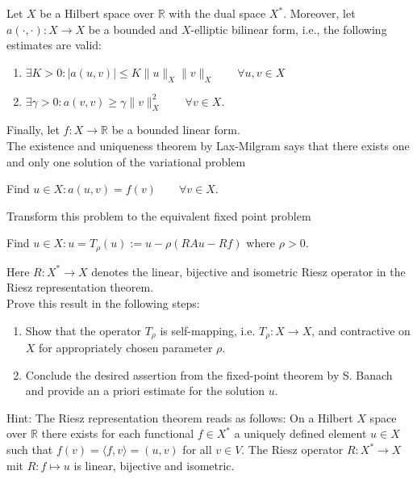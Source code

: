 \documentclass[12pt]{article}
\newenvironment{exercise}[2][Exercise]{\begin{trivlist}
\item[\hskip \labelsep {\bfseries #1}\hskip \labelsep {\bfseries #2.}]}{\end{trivlist}}
\begin{document}
\begin{exercise}{4}
Let $X$ be a Hilbert space over $\mathbb{R}$ with the dual space $X^*$. Moreover, let $a(\cdot,\cdot): X \to X$ be a bounded
and $X$-elliptic bilinear form, i.e., the following estimates are valid:
\begin{enumerate}
\item $\exists K > 0 : |a(u, v)| \leq K \|u\|_X \|v\|_X \qquad \forall u,v \in X$
\item $ \exists \gamma > 0 : a(v, v) \geq \gamma \|v\|_X^2 \qquad \forall v \in X.$
\end{enumerate}
Finally, let $f : X \to \mathbb{R}$ be a bounded linear form.\\
The existence and uniqueness theorem by Lax-Milgram says that there exists one and only one solution
of the variational problem
\begin{center}Find $u \in X : a(u, v) = f (v)\qquad \forall v \in X.$ \end{center}
Transform this problem to the equivalent fixed point problem
\begin{center}Find $u \in X : u = T_\rho (u) := u - \rho(RAu - Rf )$ where $\rho > 0$. \end{center}
Here $R :X^* \to X$ denotes the linear, bijective and isometric Riesz operator in the Riesz
representation theorem.\\
Prove this result in the following steps:
\begin{enumerate}
\item Show that the operator $T_\rho$ is self-mapping, i.e. $T_\rho : X \to X$, and contractive on $X$ for appropriately
chosen parameter $\rho$.
\item Conclude the desired assertion from the fixed-point theorem by S. Banach and provide an a priori
estimate for the solution $u$.
\end{enumerate}
Hint: The Riesz representation theorem reads as follows: On a Hilbert $X$ space over $\mathbb{R}$ there exists for
each functional $f\in X^*$ a uniquely defined element $u \in X$ such that $f(v) = \langle f, v \rangle = (u, v)$ for all $v \in V$.
The Riesz operator $R: X^* \to X$ mit $R : f \mapsto u$ is linear, bijective and isometric.
\end{exercise}
\end{document}
